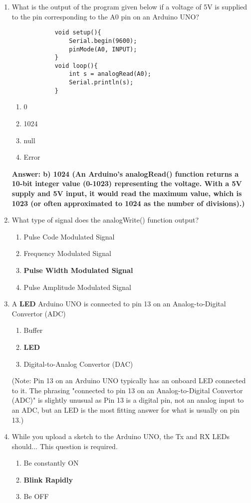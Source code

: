 \documentclass[a4paper,12pt]{article}
\begin{document}
\begin{enumerate}
		\item What is the output of the program given below if a voltage of 5V is supplied to the pin corresponding to the A0 pin on an Arduino UNO?
		\begin{verbatim}
			void setup(){
				Serial.begin(9600);
				pinMode(A0, INPUT);
			}
			void loop(){
				int s = analogRead(A0);
				Serial.println(s);
			}
		\end{verbatim}
		\begin{enumerate}
			\item 0
			\item 1024
			\item null
			\item Error
		\end{enumerate}
		\textbf{Answer: b) 1024 (An Arduino's analogRead() function returns a 10-bit integer value (0-1023) representing the voltage. With a 5V supply and 5V input, it would read the maximum value, which is 1023 (or often approximated to 1024 as the number of divisions).)}
		
		
		
		
		\item What type of signal does the analogWrite() function output?
		\begin{enumerate}
			\item Pulse Code Modulated Signal
			\item Frequency Modulated Signal
			\item \textbf{Pulse Width Modulated Signal}
			\item Pulse Amplitude Modulated Signal
		\end{enumerate}
		
		\item A \textbf{LED} Arduino UNO is connected to pin 13 on an Analog-to-Digital Convertor (ADC)
		\begin{enumerate}
			\item Buffer
			\item \textbf{LED}
			\item Digital-to-Analog Convertor (DAC)
		\end{enumerate}
		(Note: Pin 13 on an Arduino UNO typically has an onboard LED connected to it. The phrasing "connected to pin 13 on an Analog-to-Digital Convertor (ADC)" is slightly unusual as Pin 13 is a digital pin, not an analog input to an ADC, but an LED is the most fitting answer for what is usually on pin 13.)
		
		\item While you upload a sketch to the Arduino UNO, the Tx and RX LEDs should... This question is required.
		\begin{enumerate}
			\item Be constantly ON
			\item \textbf{Blink Rapidly}
			\item Be OFF
		\end{enumerate}
		

\end{enumerate}
\end{document}
